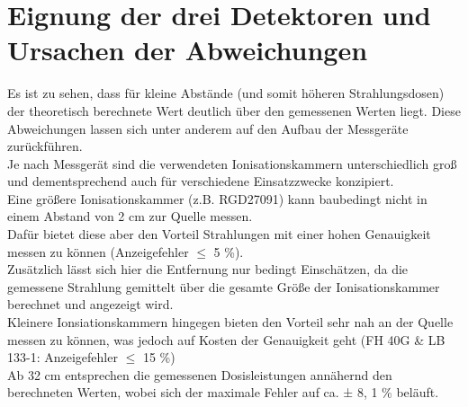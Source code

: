 \documentclass[12pt,german]{article}
\begin{document}
    \section{Eignung der drei Detektoren und Ursachen der Abweichungen}
    Es ist zu sehen, dass für kleine Abstände (und somit höheren Strahlungsdosen) der theoretisch berechnete Wert deutlich über den gemessenen Werten liegt.
    Diese Abweichungen lassen sich unter anderem auf den Aufbau der Messgeräte zurückführen. \\ 
    Je nach Messgerät sind die verwendeten Ionisationskammern unterschiedlich groß und dementsprechend auch für verschiedene Einsatzzwecke konzipiert. \\
    Eine größere Ionisationskammer (z.B. RGD27091) kann baubedingt nicht in einem Abstand von 2 cm zur Quelle messen. \\
    Dafür bietet diese aber den Vorteil Strahlungen mit einer hohen Genauigkeit messen zu können (Anzeigefehler \(\leq\) 5 \%). \\
    Zusätzlich lässt sich hier die Entfernung nur bedingt Einschätzen, da die gemessene Strahlung gemittelt über die gesamte Größe der Ionisationskammer berechnet und angezeigt wird. \\
    Kleinere Ionsiationskammern hingegen bieten den Vorteil sehr nah an der Quelle messen zu können, was jedoch auf Kosten der Genauigkeit geht (FH 40G \& LB 133-1: Anzeigefehler \(\leq\) 15 \%) \\
    Ab 32 cm entsprechen die gemessenen Dosisleistungen annähernd den berechneten Werten, wobei sich der maximale Fehler auf ca. ± 8, 1 \% beläuft. \\
    
\end{document}
